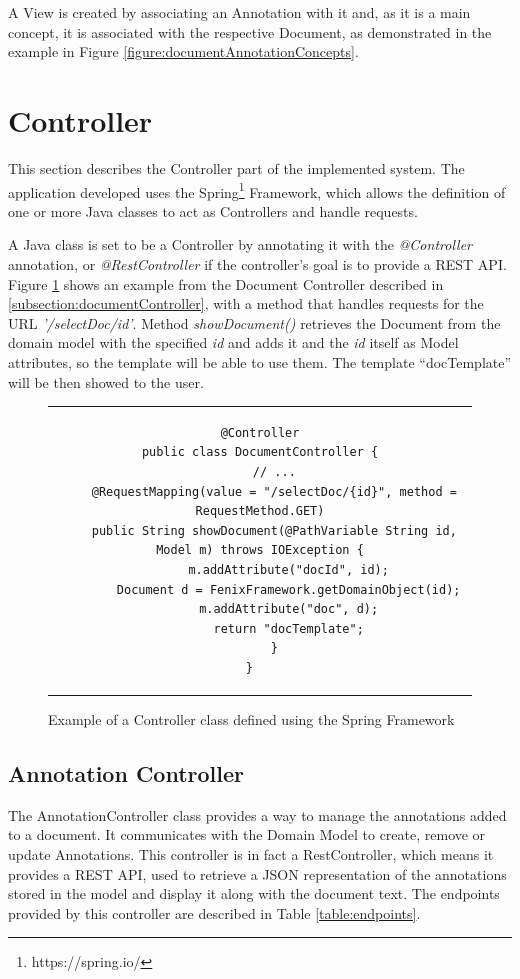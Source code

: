 A View is created by associating an Annotation with it and, as it is a main concept, it is associated with the respective Document, as demonstrated in the example in Figure \ref{figure:documentAnnotationConcepts}.

\section{Controller}

This section describes the Controller part of the implemented system. The application developed uses the Spring\footnote{https://spring.io/} Framework, which allows the definition of one or more Java classes to act as Controllers and handle requests.

A Java class is set to be a Controller by annotating it with the \textit{@Controller} annotation, or \textit{@RestController} if the controller's goal is to provide a REST API. Figure \ref{figure:springController} shows an example from the Document Controller described in \ref{subsection:documentController}, with a method that handles requests for the URL \textit{'/selectDoc/{id}'}. Method \textit{showDocument()} retrieves the Document from the domain model with the specified \textit{id} and adds it and the \textit{id} itself as Model attributes, so the template will be able to use them. The template ``docTemplate'' will be then showed to the user.

\begin{figure}[h]
\centering
\lstset{style=customjava}
\begin{tabular}{c}
\begin{lstlisting}
@Controller
public class DocumentController {
	// ...
	@RequestMapping(value = "/selectDoc/{id}", method = RequestMethod.GET)
	public String showDocument(@PathVariable String id, Model m) throws IOException {
		m.addAttribute("docId", id);
		Document d = FenixFramework.getDomainObject(id);
		m.addAttribute("doc", d);
		return "docTemplate";
	}
}	
\end{lstlisting}
\end{tabular}
\caption{Example of a Controller class defined using the Spring Framework} 
\label{figure:springController}
\end{figure}

\subsection{Annotation Controller}
The AnnotationController class provides a way to manage the annotations added to a document. It communicates with the Domain Model to create, remove or update Annotations. This controller is in fact a RestController, which means it provides a REST API, used to retrieve a JSON representation of the annotations stored in the model and display it along with the document text. 
The endpoints provided by this controller are described in Table \ref{table:endpoints}.
	
